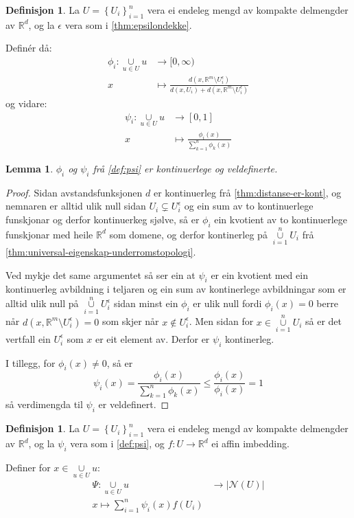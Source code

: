 \documentclass[a4paper, 12pt, norsk]{article}
\theoremstyle{plain}
\newtheorem{lemma}[theorem]{Lemma}
\theoremstyle{definition}
\newtheorem{definition}[theorem]{Definisjon}
\newcommand{\Rb}{\mathbb{R}}
\newcommand{\Nc}{\mathcal{N}}
\newcommand{\union}{ \mathop{\cup}\limits }
\newcommand{\gr}[1]{ \lvert #1 \rvert } %
\newcommand{\set}[1]{ \left\{ #1 \right\} } %
\begin{document}
\begin{definition} \label{def:psi}
	La \( U = \set{U_i}_{i=1}^n \) vera ei endeleg mengd av kompakte delmengder av \( \Rb^d \), og la \( \epsilon \) vera som i \autoref{thm:epsilondekke}.

	Definér då:
	\begin{align*}
		\phi_i : \union_{u \in U} u &\to [0, \infty) \\
		x &\mapsto \frac{d(x, \Rb^m \setminus U_i^\epsilon)}{d(x, U_i) + d(x, \Rb^m \setminus U_i^\epsilon)}
	\end{align*}
	og vidare:
	\begin{align*}
		\psi_i : \union_{u \in U} u &\to [0, 1] \\
		x &\mapsto \frac{\phi_i(x)}{\sum_{k=1}^n \phi_k(x)}
	\end{align*}
\end{definition}

\begin{lemma}
	\( \phi_i \) og \( \psi_i \) frå \autoref{def:psi} er kontinuerlege og veldefinerte.
\end{lemma}

\begin{proof} 
	Sidan avstandsfunksjonen \( d \) er kontinuerleg frå \autoref{thm:distanse-er-kont}, og nemnaren er alltid ulik null sidan \( U_i \subsetneq U_i^\epsilon \) og ein sum av to kontinuerlege funskjonar og derfor kontinuerkeg sjølve, så er \( \phi_i \) ein kvotient av to kontinuerlege funskjonar med heile \( \Rb^d \) som domene, og derfor kontinerleg på \( \union_{i=1}^n U_i \) frå \autoref{thm:universal-eigenskap-underromstopologi}.

	Ved mykje det same argumentet så ser ein at \( \psi_i \) er ein kvotient med ein kontinuerleg avbildning i teljaren og ein sum av kontinerlege avbildningar som er alltid ulik null på \( \union_{i=1}^n U_i^\epsilon \) sidan minst ein \( \phi_i \) er ulik null fordi \( \phi_i(x)=0 \) berre når \( d(x, \Rb^m \setminus U_i^\epsilon)=0 \) som skjer når \( x \not\in U_i^\epsilon \). Men sidan for \( x \in \union_{i=1}^n U_i \) så er det vertfall ein \( U_i^\epsilon \) som \( x \) er eit element av. Derfor er \( \psi_i \) kontinerleg.

	I tillegg, for \( \phi_i(x) \neq 0 \), så er
	\[
		\psi_i(x) = \frac{\phi_i(x)}{\sum_{k=1}^n \phi_k(x)} \leq \frac{\phi_i(x)}{\phi_i(x)} = 1
	\]
	så verdimengda til \( \psi_i \) er veldefinert.
\end{proof}

\begin{definition} \label{def:Psi}
	La \( U = \set{U_i}_{i=1}^n \) vera ei endeleg mengd av kompakte delmengder av \( \Rb^d \), og la \( \psi_i \) vera som i \autoref{def:psi}, og \( f: U \to \Rb^d \) ei affin imbedding. 
	
	Definer for \( x \in \union_{u \in U} u \):
	\begin{align*}
		\Psi : \union_{u \in U} u &\to \gr{\Nc(U)} \\
		x \mapsto \sum_{i=1}^n \psi_i(x)f(U_i)
	\end{align*}
\end{definition}
\end{document}
